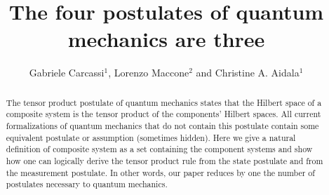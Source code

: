 \documentclass[aps,prl,amsmath,amssymb,twocolumn,nofootinbib]{revtex4}
\theoremstyle{plain}
\theoremstyle{definition}
\theoremstyle{remark}
\begin{document}
\title{The four postulates of quantum mechanics are three}
\author{Gabriele Carcassi$^1$, Lorenzo Maccone$^2$ and Christine A. Aidala$^1$
}
\begin{abstract}
  The tensor product postulate of quantum mechanics states that the
  Hilbert space of a composite system is the tensor product of the
  components' Hilbert spaces. All current formalizations of quantum
  mechanics that do not contain this postulate contain some equivalent
  postulate or assumption (sometimes hidden). Here we give a natural
  definition of composite system as a set containing the component
  systems and show how one can logically derive the tensor product
  rule from the state postulate and from the measurement postulate. In
  other words, our paper reduces by one the number of postulates
  necessary to quantum mechanics.
\end{abstract}
\pacs{}
\maketitle
\end{document}

